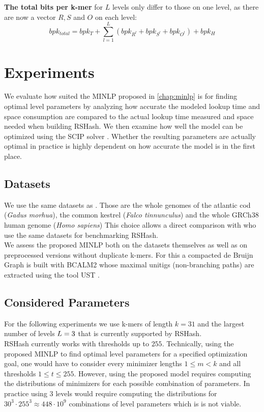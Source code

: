 \documentclass[a4paper,titlepage,onecolumn,oneside,12pt,nenglish,titlepage=firstiscover]{scrbook}
\theoremstyle{plain} %
\theoremstyle{definition} %
\theoremstyle{remark} %
\theoremstyle{plain}
\newcommand{\minimizerLength}{m}
\newcommand{\threshold}{t}
\newcommand{\level}{l}
\begin{document}
\textbf{The total bits per k-mer} for $L$ levels only differ to those on one level, as there are now a vector $R,S$ and $O$ on each level:
\[ bpk_{total} = bpk_T + \sum_{l=1}^{L} \left(bpk_{R^\level} + bpk_{S^\level} + bpk_{O^\level}\right) + bpk_H\]

\chapter{Experiments}\label{chap:experiments}
We evaluate how suited the MINLP proposed in \cref{chap:minlp} is for finding optimal level parameters by analyzing how accurate the modeled lookup time and space consumption are compared to the actual lookup time measured and space needed when building RSHash. We then examine how well the model can be optimized using the SCIP solver \cite{AchterbergBertholdKochetal.2008, Achterberg2009, BestuzhevaChmielaMuellerSerranoVigerskeWegscheider2023}. Whether the resulting parameters are actually optimal in practice is highly dependent on how accurate the model is in the first place.

\section{Datasets}
We use the same datasets as \citet{pibiri_sparse_2022}. Those are the whole genomes of the atlantic cod (\textit{Gadus morhua}), the common kestrel (\textit{Falco tinnunculus}) and the whole GRCh38 human genome (\textit{Homo sapiens}) This choice allows a direct comparison with \citet{schulte-mattler_rshash_2026} who use the same datasets for benchmarking RSHash.\\
We assess the proposed MINLP both on the datasets themselves as well as on preprocessed versions without duplicate k-mers. For this a compacted de Bruijn Graph is built with BCALM2 \cite{chikhi_compacting_2016} whose maximal unitigs (non-branching paths) are extracted using the tool UST \cite{doi:10.1089/cmb.2020.0431}.\\


\section{Considered Parameters} \label{sec:consideredParameters}
For the following experiments we use k-mers of length $k = 31$ and the largest number of levels ${L} = 3$ that is currently supported by RSHash.
\\
RSHash currently works with thresholds up to $255$.
Technically, using the proposed MINLP to find optimal level parameters for a specified optimization goal, one would have to consider every minimizer lengths $1 \leq \minimizerLength < k$ and all thresholds $1 \leq \threshold \leq 255$. However, using the proposed model requires computing the distributions of minimizers for each possible combination of parameters. In practice using $3$ levels would require computing the distributions for $30^3 \cdot 255^3 \approx 448 \cdot 10^9$ combinations of level parameters which is is not viable.
\\
\end{document}
